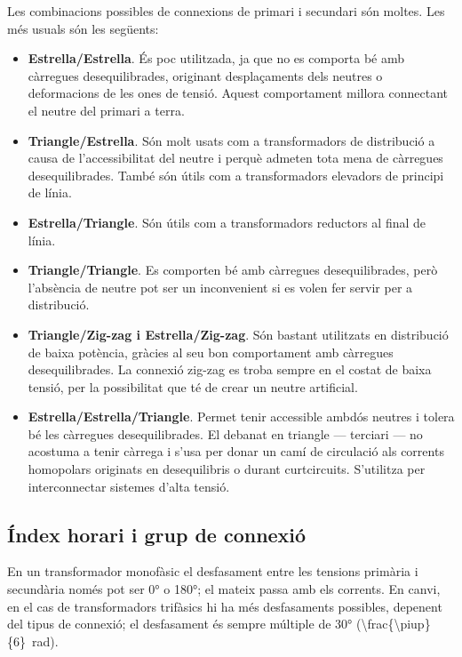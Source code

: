 Les combinacions possibles de connexions de primari i secundari són moltes. Les més usuals són les següents:
\begin{itemize}
   \item \textbf{Estrella/Estrella}. És poc utilitzada, ja que no es comporta bé amb càrregues desequilibrades, originant desplaçaments dels neutres o deformacions de les ones de tensió. Aquest comportament millora connectant el neutre del primari a terra.
   \item \textbf{Triangle/Estrella}. Són molt usats com a transformadors de distribució a causa de l'accessibilitat del neutre i perquè admeten tota mena de càrregues desequilibrades. També són útils com a transformadors elevadors de principi de línia.
   \item \textbf{Estrella/Triangle}. Són útils com a transformadors reductors al final de línia.
   \item \textbf{Triangle/Triangle}. Es comporten bé amb càrregues desequilibrades, però l'absència de neutre pot ser un inconvenient si es volen fer servir per a distribució.
   \item \textbf{Triangle/Zig-zag i Estrella/Zig-zag}. Són bastant utilitzats en distribució de baixa potència, gràcies al seu bon comportament amb càrregues desequilibrades. La connexió zig-zag es troba sempre en el costat de baixa tensió, per la possibilitat que té de crear un neutre artificial.
   \item \textbf{Estrella/Estrella/Triangle}. Permet tenir accessible ambdós  neutres i tolera  bé les càrregues  desequilibrades. El debanat en triangle --- terciari --- no acostuma a tenir càrrega i s'usa per donar un camí de circulació als corrents homopolars originats en desequilibris o durant curtcircuits. S'utilitza per interconnectar sistemes d'alta tensió.
\end{itemize}


\subsection{Índex horari i grup de connexió}\label{sec:connex-index-horari}

En un transformador monofàsic el desfasament entre les tensions primària i secundària només pot ser \ang{0} o \ang{180}; el mateix passa amb els corrents. En canvi, en el cas de transformadors trifàsics hi ha més desfasaments possibles, depenent del tipus de connexió; el desfasament és sempre múltiple de \ang{30} 
(\qty[parse-numbers=false]{\frac{\piup}{6}}{rad}).

